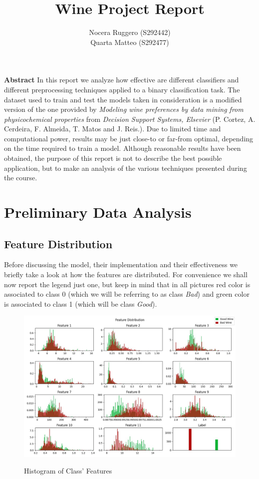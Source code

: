 \documentclass[12pt, twocolumn]{article}
\title{Wine Project Report}
\author{Nocera Ruggero (S292442) \\ Quarta Matteo (S292477)}
\date{}
\begin{document}
\maketitle
\begin{strip}
    {\bf Abstract}
    In this report we analyze how effective are different classifiers and different preprocessing techniques applied to a binary classification task.
    The dataset used to train and test the models taken in consideration is a modified version of
    the one provided by {\it Modeling wine preferences by data mining from physicochemical properties}
    from {\it Decision Support Systems, Elsevier} (P. Cortez, A. Cerdeira, F. Almeida, T. Matos and J. Reis.).
    Due to limited time and computational power, results may be just close-to or far-from optimal, depending on the time required to train a model.
    Although reasonable results have been obtained, the purpose of this report is not to describe the best possible application,
    but to make an analysis of the various techniques presented during the course.

\end{strip}
\tableofcontents


\section{Preliminary Data Analysis}
\subsection{Feature Distribution}

Before discussing the model, their implementation and their effectiveness we briefly take a look at how the features are distributed.
For convenience we shall now report the legend just one, but keep in mind that in all pictures red color is associated to class 0 (which we will be referring to as class {\it Bad}) and green color is associated to class 1 (which will be class {\it Good}).

\begin{figure}[H] 
    \caption{Histogram of Class' Features}
    \label{fig:disthist}
    {\includegraphics[width=\linewidth]{dist.jpg}}
\end{figure}
\end{document}
